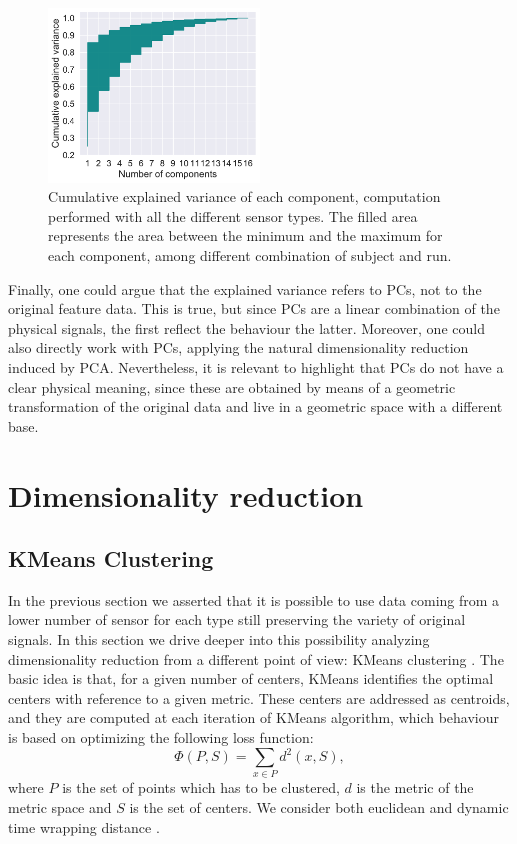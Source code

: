 \documentclass[10pt, a4paper, twocolumn]{article}
\theoremstyle{definition}
\begin{document}
\begin{figure} \centering
         \includegraphics[width=0.5\textwidth]{../pca/pca_results/fill_global_ex_var.pdf}
    \caption{Cumulative explained variance of each component, computation performed with all the different sensor types. The filled area represents the area between the minimum and the maximum for each component, among different combination of subject and run. }\label{fig:pca_het}
\end{figure}
\vspace{0.2cm}
\par
Finally, one could argue that the explained variance refers to PCs, not to the original feature data. This is true, but since PCs are a linear combination of the physical signals, the first reflect the behaviour the latter. Moreover, one could also directly work with PCs, applying the natural dimensionality reduction induced by PCA. Nevertheless, it is relevant to highlight that PCs do not have a clear physical meaning, since these are obtained by means of a geometric transformation of the original data and live in a geometric space with a different base. 

\section{Dimensionality reduction}

\subsection{KMeans Clustering}
In the previous section we asserted that it is possible to use data coming from a lower number of sensor for each type still preserving the variety of original signals. In this section we drive deeper into this possibility analyzing dimensionality reduction from a different point of view: KMeans clustering \cite{kmeans} \cite{JMLR:v21:20-091}. The basic idea is that, for a given number of centers, KMeans identifies the optimal centers with reference to a given metric. These centers are addressed as centroids, and they are computed at each iteration of KMeans algorithm, which behaviour is based on optimizing the following loss function:
\begin{equation}
\Phi(P,S) = \sum_{x\in P} d^2(x,S),
\end{equation}
where $P$ is the set of points which has to be clustered, $d$ is the metric of the metric space and $S$ is the set of centers. We consider both euclidean and dynamic time wrapping distance \cite{dtw}.
\end{document}
